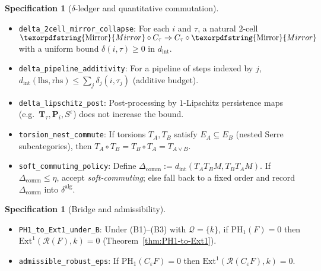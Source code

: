 \documentclass[11pt]{article}
\DeclareRobustCommand{\hyp}{\nobreakdash-}
\numberwithin{equation}{section}
\theoremstyle{definition}
\newtheorem{specification}[theorem]{Specification}
\DeclareRobustCommand{\Mirror}{\texorpdfstring{\ensuremath{\operatorname{Mirror}}}{Mirror}}
\begin{document}
\begin{specification}[$\delta$-ledger and quantitative commutation]\label{spec:delta-ledger}
\begin{itemize}
  \item \texttt{delta\_2cell\_mirror\_collapse}: For each $i$ and $\tau$, a natural $2$-cell $\Mirror\circ C_\tau \Rightarrow C_\tau\circ \Mirror$ with a uniform bound $\delta(i,\tau)\ge 0$ in $d_{\mathrm{int}}$.
  \item \texttt{delta\_pipeline\_additivity}: For a pipeline of steps indexed by $j$, $d_{\mathrm{int}}(\text{lhs},\text{rhs})\le \sum_j \delta_j(i,\tau_j)$ (additive budget).
  \item \texttt{delta\_lipschitz\_post}: Post\hyp processing by $1$-Lipschitz persistence maps (e.g.\ $\mathbf{T}_\tau,\mathbf{P}_i,S^\varepsilon$) does not increase the bound.
  \item \texttt{torsion\_nest\_commute}: If torsions $T_A,T_B$ satisfy $E_A\subseteq E_B$ (nested Serre subcategories), then $T_A\circ T_B=T_B\circ T_A=T_{A\vee B}$.
  \item \texttt{soft\_commuting\_policy}: Define $\Delta_{\mathrm{comm}}:=d_{\mathrm{int}}(T_A T_B M,T_B T_A M)$. If $\Delta_{\mathrm{comm}}\le \eta$, accept \emph{soft\hyp commuting}; else fall back to a fixed order and record $\Delta_{\mathrm{comm}}$ into $\delta^{\mathrm{alg}}$.
\end{itemize}
\end{specification}

\begin{specification}[Bridge and admissibility]\label{spec:bridge}
\begin{itemize}
  \item \texttt{PH1\_to\_Ext1\_under\_B}: Under (B1)–(B3) with $\mathcal{Q}=\{k\}$, if $\mathrm{PH}_1(F)=0$ then $\mathrm{Ext}^1(\mathcal{R}(F),k)=0$ (Theorem~\ref{thm:PH1-to-Ext1}).
  \item \texttt{admissible\_robust\_eps}: If $\mathrm{PH}_1(C_\varepsilon F)=0$ then $\mathrm{Ext}^1(\mathcal{R}(C_\varepsilon F),k)=0$.
\end{itemize}
\end{specification}
\end{document}
